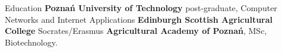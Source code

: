 \begin{rubric}{Education}
\entry*[2010 -- 2011]\textbf{Poznań University of Technology}
    post-graduate,\newline
    Computer Networks and Internet Applications
\entry*[2005]\textbf{Edinburgh Scottish Agricultural College}\newline
    Socrates/Erasmus
\entry*[2001 -- 2006]\textbf{Agricultural Academy of Poznań},
    MSc,\newline
    Biotechnology.
\end{rubric}
